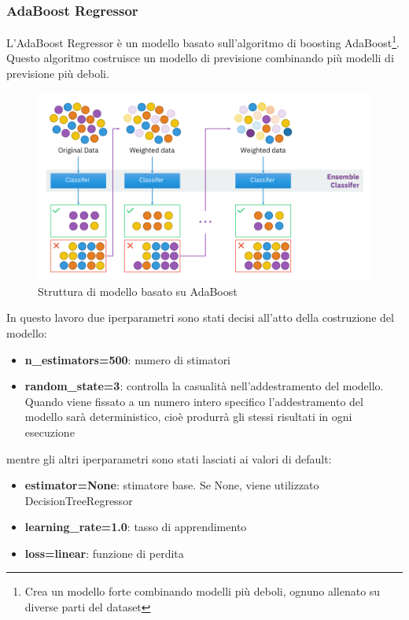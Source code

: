 \subsubsection{AdaBoost Regressor}
L'AdaBoost Regressor è un modello basato sull'algoritmo di boosting AdaBoost\footnote{Crea un modello forte combinando modelli più deboli, ognuno allenato su diverse parti del dataset}{}. Questo algoritmo costruisce un modello di previsione combinando più modelli di previsione più deboli.
\begin{figure}[H]
    \centering
    \includegraphics[scale=0.4]{images/AdaBoost.png}
    \caption*{Struttura di modello basato su AdaBoost}
\end{figure}

\noindent In questo lavoro due iperparametri sono stati decisi all'atto della costruzione del modello:

\begin{itemize}
    \item \textbf{n\_estimators=500}: numero di stimatori
    \item \textbf{random\_state=3}:  controlla la casualità nell'addestramento del modello. Quando viene fissato a un numero intero specifico l'addestramento del modello sarà deterministico, cioè produrrà gli stessi risultati in ogni esecuzione
\end{itemize}

\noindent mentre gli altri iperparametri sono stati lasciati ai valori di default:
\begin{itemize}
    \item \textbf{estimator=None}: stimatore base. Se None, viene utilizzato DecisionTreeRegressor
    \item \textbf{learning\_rate=1.0}: tasso di apprendimento
    \item \textbf{loss=linear}: funzione di perdita
\end{itemize}

